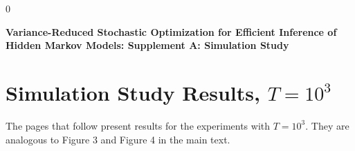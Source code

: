 \documentclass[12pt]{article}
\newcommand{\blind}{0}
\begin{document}
\blind
{
  \bigskip
  \bigskip
  \bigskip
  \begin{center}
    {\LARGE\bf Variance-Reduced Stochastic Optimization for Efficient Inference of Hidden Markov Models: Supplement A: Simulation Study}
  \end{center}
  \medskip
} \fi


\newpage
{} %

\section{Simulation Study Results, $T = 10^{3}$}

The pages that follow present results for the experiments with $T=10^{3}$. They are analogous to Figure 3 and Figure 4 in the main text.

\newpage
\end{document}
